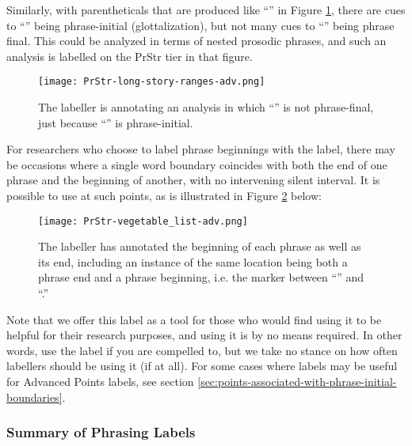 Similarly, with parentheticals that are produced like “” in Figure \ref{fig:long-story-ranges PrStr Adv}, there are cues to “” being phrase-initial (glottalization), but not many cues to “” being phrase final. This could be analyzed in terms of nested prosodic phrases, and such an analysis is labelled on the PrStr tier in that figure.

\begin{figure}[H]
\centering
%
\texttt{[image: PrStr-long-story-ranges-adv.png]}
%
\caption{The labeller is annotating an analysis in which “” is not phrase-final, just because “” is phrase-initial.%
\label{fig:long-story-ranges PrStr Adv}%
}
\end{figure}

For researchers who choose to label phrase beginnings with the \textlabel{[} label, there may be occasions where a single word boundary coincides with both the end of one phrase and the beginning of another, with no intervening silent interval. It is possible to use \textlabel{][} at such points, as is illustrated in Figure \ref{fig:vegetable_list PrStr Adv} below:

\begin{figure}[H]
\centering
%
\texttt{[image: PrStr-vegetable\_list-adv.png]}
%
\caption[The labeller has annotated the beginning of each phrase as well as its end.]{The labeller has annotated the beginning of each phrase as well as its end, including an instance of the same location being both a phrase end and a phrase beginning, i.e. the marker between “” and “.”%
\label{fig:vegetable_list PrStr Adv}%
}
\end{figure}

Note that we offer this \textlabel{[} label as a tool for those who would find using it to be helpful for their research purposes, and using it is by no means required. In other words, use the \textlabel{[} label if you are compelled to, but we take no stance on how often labellers should be using it (if at all). For some cases where \textlabel{[} labels may be useful for Advanced Points labels, see section \ref{sec:points-associated-with-phrase-initial-boundaries}.

\subsubsection{Summary of Phrasing Labels}\label{sec:summary-of-phrasing-labels}

